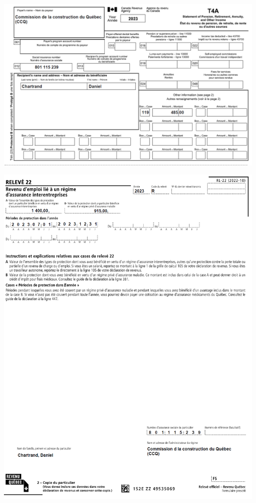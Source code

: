 \noindent
\includegraphics[width=\textwidth]{probleme/chapitre-2/T4A-CCQ.png}

\noindent
\includegraphics[width=\textwidth]{probleme/chapitre-2/RL22-CCQ.png}

